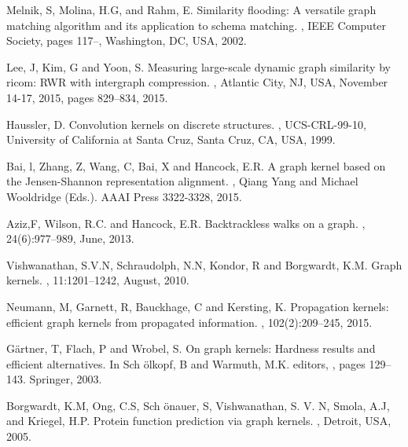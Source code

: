 \begin{thebibliography}{99}
 Melnik, S,  Molina, H.G, and Rahm, E.
\newblock Similarity flooding: A versatile graph matching algorithm and its application to schema matching. 
, IEEE Computer Society, pages 117–, Washington, DC, USA, 2002. 

 Lee, J, Kim, G and Yoon, S.
\newblock Measuring large-scale dynamic graph similarity by ricom: RWR with intergraph compression. 
, Atlantic City, NJ, USA, November 14-17, 2015, pages 829–834, 2015.


 Haussler, D. 
\newblock Convolution kernels on discrete structures.
, UCS-CRL-99-10, University of California at Santa Cruz, Santa Cruz, CA, USA, 1999.

 Bai, l, Zhang, Z,  Wang, C,  Bai, X and Hancock, E.R.
\newblock A graph kernel based on the Jensen-Shannon representation alignment. 
, Qiang Yang and Michael Wooldridge (Eds.). AAAI Press 3322-3328, 2015.


 Aziz,F, Wilson, R.C. and Hancock, E.R.
\newblock Backtrackless walks on a graph.
, 24(6):977–989, June, 2013.

 Vishwanathan, S.V.N, Schraudolph, N.N, Kondor, R and Borgwardt, K.M.
\newblock Graph kernels. 
, 11:1201–1242, August, 2010.


 Neumann, M,  Garnett, R,  Bauckhage, C and Kersting, K. \newblock Propagation kernels: efficient graph kernels from propagated
information. 
, 102(2):209–245, 2015.

 G{\"a}rtner, T, Flach, P and Wrobel, S. 
\newblock On graph kernels: Hardness results and efficient alternatives.
\newblock In Sch {\"o}lkopf, B and Warmuth, M.K. editors,
, pages 129–143. Springer, 2003.

 Borgwardt, K.M, Ong, C.S,   Sch {\"o}nauer, S, Vishwanathan, S. V. N, Smola, A.J, and Kriegel, H.P.
\newblock Protein function prediction via graph kernels.
, Detroit, USA, 2005.



\end{thebibliography}
